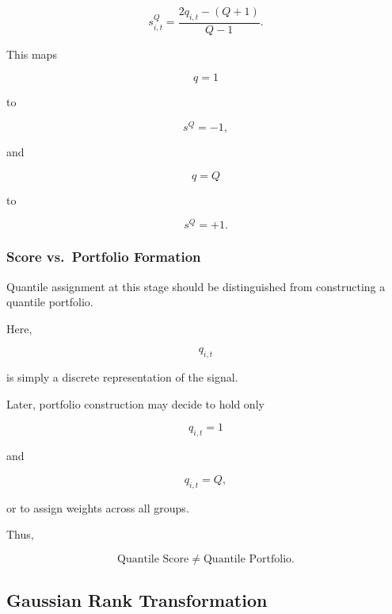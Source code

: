 \documentclass[11pt,a4paper]{article}
\begin{document}
\begin{equation}
\boxed{
s_{i,t}^{Q}
=
\frac{
2q_{i,t}
-
(Q+1)
}{
Q-1
}.
}
\end{equation}

This maps

\begin{equation}
q=1
\end{equation}

to

\begin{equation}
s^Q=-1,
\end{equation}

and

\begin{equation}
q=Q
\end{equation}

to

\begin{equation}
s^Q=+1.
\end{equation}


\subsubsection{Score vs.\ Portfolio Formation}

Quantile assignment at this stage should be distinguished from constructing a
quantile portfolio.

Here,

\begin{equation}
q_{i,t}
\end{equation}

is simply a discrete representation of the signal.

Later, portfolio construction may decide to hold only

\begin{equation}
q_{i,t}=1
\end{equation}

and

\begin{equation}
q_{i,t}=Q,
\end{equation}

or to assign weights across all groups.

Thus,

\begin{equation}
\boxed{
\text{Quantile Score}
\neq
\text{Quantile Portfolio}.
}
\end{equation}


\subsection{Gaussian Rank Transformation}
\label{subsec:gaussian_rank_transformation}
\end{document}
